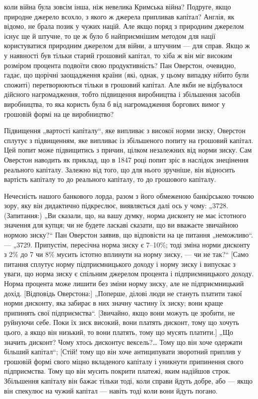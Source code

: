 \parcont{}  %
коли війна була зовсім інша, ніж невелика Кримська війна? Подруге, якщо природне джерело всохло, з
якого ж джерела припливав капітал? Англія, як відомо, не брала позик у чужих націй.
Але якщо поряд з природним джерелом існує ще й штучне, то
це ж було б найприємнішим методом для нації користуватися
природним джерелом для війни, а штучним — для справ. Якщо ж
у наявності був тільки старий грошовий капітал, то хіба ж
він міг високим розміром процента подвоїти свою продуктивність?
Пан Оверстон, очевидно, гадає, що щорічні заощадження країни
(які, однак, у цьому випадку нібито були спожиті) перетворюються тільки в грошовий капітал. Але якби
не відбувалося
дійсного нагромадження, тобто підвищення виробництва і збільшення засобів виробництва, то яка
користь була б від нагромадження боргових вимог у грошовій формі на це виробництво?

Підвищення „вартості капіталу“, яке випливає з високої
норми зиску, Оверстон сплутує з підвищенням, яке випливає
із збільшеного попиту на грошовий капітал. Цей попит може
підвищитись з причин, цілком незалежних від норми зиску. Сам
Оверстон наводить як приклад, що в 1847 році попит зріс в наслідок знецінення реального капіталу.
Залежно від того, що для
нього зручніше, він відносить вартість капіталу то до реального
капіталу, то до грошового капіталу.

Нечесність нашого банкового лорда, разом з його обмеженою
банкірською точкою зору, яку він дидактично підкреслює, виявляється далі ось у чому: „3728.
(Запитання:) „Ви сказали, що,
на вашу думку, норма дисконту не має істотного значення для
купця; чи не будете ласкаві сказати, що ви вважаєте звичайною нормою зиску?“ Пан Оверстон заявив, що
відповісти на це
питання „неможливо“. — „3729. Припустім, пересічна норма
зиску є 7--10\%; тоді зміна норми дисконту з 2\% до 7 чи 8\%
мусить істотно вплинути на норму зиску, — чи не так?“ [Само
питання сплутує норму підприємницького доходу і норму зиску
і випускає з уваги, що норма зиску є спільним джерелом процента
і підприємницького доходу. Норма процента може лишити без
зміни норму зиску, але не підприємницький дохід. [Відповідь Оверстона:] „Поперше, ділові люди не
стануть платити такої норми
дисконту, яка забирає в них значну частину їх зиску; вони краще
припинять свої підприємства“. [Звичайно, якщо вони можуть це
зробити, не руйнуючи себе. Поки їх зиск високий, вони платять
дисконт, тому що хочуть цього, а якщо він низький, то вони платять,
тому що мусять платити.] „Що значить дисконт? Чому хтось
дисконтує вексель?\dots{} Тому що він хоче одержати більший капітал“; [Стій! тому що він хоче
антиципувати зворотний приплив у грошовій формі свого міцно вкладеного капіталу і
уникнути припинення свого підприємства. Тому що він мусить
покрити платежі, яким надійшов строк. Збільшення капіталу він
бажає тільки тоді, коли справи йдуть добре, або — якщо він спекулює на чужий капітал — навіть тоді
коли вони йдуть погано.
\parbreak{}  %
